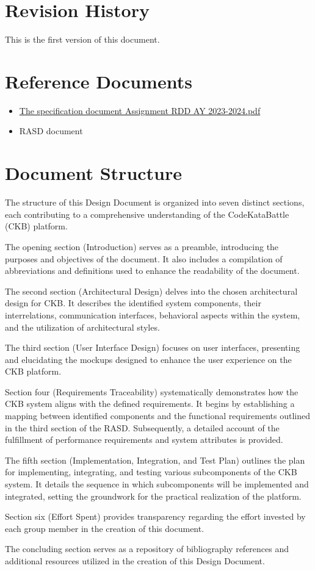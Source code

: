 \section{Revision History}
\label{sec:revision_history}
This is the first version of this document.

\section{Reference Documents}
\label{sec:reference_documents}%
\begin{itemize}
    \item \href{https://polimi365-my.sharepoint.com/:b:/g/personal/10710351_polimi_it/EZXUPFfeFKdBkf5M8W-EBYgB2JrrVLr23BYJ4MXQ7kzUkA?e=o0wvyw}{The specification document Assignment RDD AY 2023-2024.pdf}
    \item {RASD document}
\end{itemize}

\section{Document Structure}
\label{sec:document_structure}

The structure of this Design Document is organized into seven distinct sections, each contributing to a comprehensive understanding of the CodeKataBattle (CKB) platform.

The opening section (Introduction) serves as a preamble, introducing the purposes and objectives of the document. 
It also includes a compilation of abbreviations and definitions used to enhance the readability of the document.

The second section (Architectural Design) delves into the chosen architectural design for CKB. 
It describes the identified system components, their interrelations, communication interfaces, behavioral aspects within the system, and the utilization of architectural styles.

The third section (User Interface Design) focuses on user interfaces, presenting and elucidating the mockups designed to enhance the user experience on the CKB platform.

Section four (Requirements Traceability) systematically demonstrates how the CKB system aligns with the defined requirements. 
It begins by establishing a mapping between identified components and the functional requirements outlined in the third section of the RASD. 
Subsequently, a detailed account of the fulfillment of performance requirements and system attributes is provided.

The fifth section (Implementation, Integration, and Test Plan) outlines the plan for implementing, integrating, and testing various subcomponents of the CKB system. 
It details the sequence in which subcomponents will be implemented and integrated, setting the groundwork for the practical realization of the platform.

Section six (Effort Spent) provides transparency regarding the effort invested by each group member in the creation of this document. 

The concluding section serves as a repository of bibliography references and additional resources utilized in the creation of this Design Document. 
